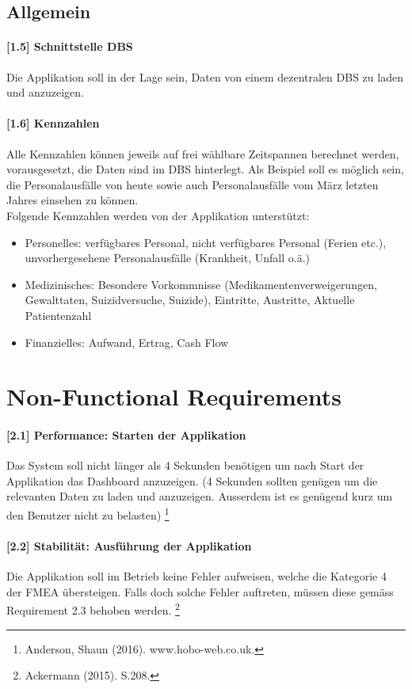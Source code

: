 \documentclass[a4paper]{scrreprt}
\begin{document}
\subsection{Allgemein}
\paragraph{[1.5] Schnittstelle DBS}
Die Applikation soll in der Lage sein, Daten von einem dezentralen DBS zu laden und anzuzeigen. 

\paragraph{[1.6] Kennzahlen}
Alle Kennzahlen können jeweils auf frei wählbare Zeitspannen berechnet werden, vorausgesetzt, die Daten sind im DBS hinterlegt. Als Beispiel soll es möglich sein, die Personalausfälle von heute sowie auch Personalausfälle vom März letzten Jahres einsehen zu können. \\
Folgende Kennzahlen werden von der Applikation unterstützt:
\begin{itemize}
\item Personelles: verfügbares Personal, nicht verfügbares Personal (Ferien etc.), unvorhergesehene Personalausfälle (Krankheit, Unfall o.ä.)
\item Medizinisches: Besondere Vorkommnisse (Medikamentenverweigerungen, Gewalttaten, Suizidversuche, Suizide), Eintritte, Austritte, Aktuelle Patientenzahl
\item Finanzielles: Aufwand, Ertrag, Cash Flow
\end{itemize}

\section{Non-Functional Requirements}
\paragraph{[2.1] Performance: Starten der Applikation}
Das System soll nicht länger als 4 Sekunden benötigen um nach Start der Applikation das Dashboard anzuzeigen. (4 Sekunden sollten genügen um die relevanten Daten zu laden und anzuzeigen. Ausserdem ist es genügend kurz um den Benutzer nicht zu belasten)
\footnote{Anderson, Shaun (2016). www.hobo-web.co.uk.}

\paragraph{[2.2] Stabilität: Ausführung der Applikation}
Die Applikation soll im Betrieb keine Fehler aufweisen, welche die Kategorie 4 der FMEA übersteigen. Falls doch solche Fehler auftreten, müssen diese gemäss Requirement 2.3 behoben werden. 
\footnote{Ackermann (2015). S.208.}
\end{document}
